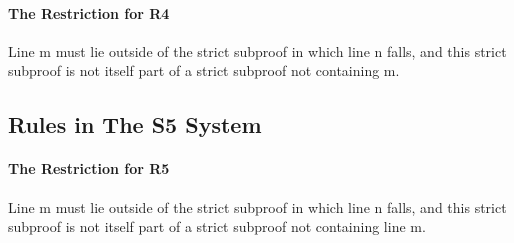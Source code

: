 \paragraph{The Restriction for R4}
Line m must lie outside of the strict subproof in which line n falls, and this strict subproof is not itself part of a strict subproof not containing m.

\begin{fitchproof}
\open
{} 
\end{fitchproof}

\subsection*{Rules in The S5 System}
\begin{multicols}{2}

\begin{fitchproof}
\end{fitchproof}

\begin{fitchproof}
\end{fitchproof}
\end{multicols}

\paragraph{The Restriction for R5}
Line m must lie outside of the strict subproof in which line n falls, and this strict subproof is not itself part of a strict subproof not containing line m.

\begin{multicols}{2}
\begin{fitchproof}
\open
{} 
\end{fitchproof}

\begin{fitchproof}
\open
{} 
\end{fitchproof}
\end{multicols}